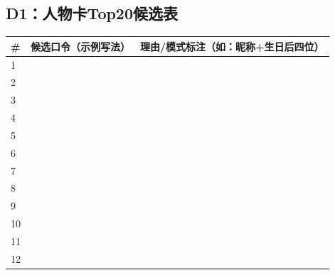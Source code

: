 \documentclass[UTF8,a4paper,12pt]{ctexart}
\begin{document}
\subsection*{D1：人物卡Top20候选表}
\begin{longtable}{@{}p{}p{}p{}@{}}
\toprule
\textbf{\#} & \textbf{候选口令（示例写法）} & \textbf{理由/模式标注（如：昵称+生日后四位）} \\
\midrule
\endhead
1 & \underline{\hspace{16em}} & \underline{\hspace{18em}} \\
2 & \underline{\hspace{16em}} & \underline{\hspace{18em}} \\
3 & \underline{\hspace{16em}} & \underline{\hspace{18em}} \\
4 & \underline{\hspace{16em}} & \underline{\hspace{18em}} \\
5 & \underline{\hspace{16em}} & \underline{\hspace{18em}} \\
6 & \underline{\hspace{16em}} & \underline{\hspace{18em}} \\
7 & \underline{\hspace{16em}} & \underline{\hspace{18em}} \\
8 & \underline{\hspace{16em}} & \underline{\hspace{18em}} \\
9 & \underline{\hspace{16em}} & \underline{\hspace{18em}} \\
10 & \underline{\hspace{16em}} & \underline{\hspace{18em}} \\
11 & \underline{\hspace{16em}} & \underline{\hspace{18em}} \\
12 & \underline{\hspace{16em}} & \underline{\hspace{18em}} \\

\end{longtable}
\end{document}
